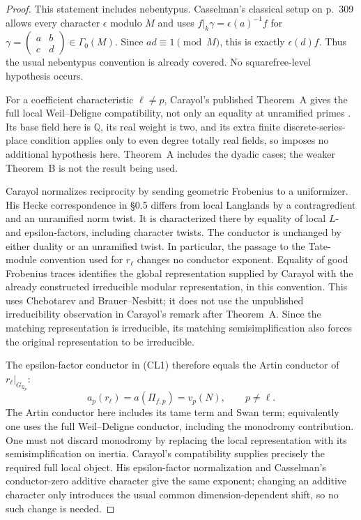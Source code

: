 \begin{proof}
This statement includes nebentypus. Casselman's classical setup on
p.~309 allows every character $\epsilon$ modulo $M$ and uses
$f|_k\gamma=\epsilon(a)^{-1}f$ for
$\gamma=\left(\begin{smallmatrix}a&b\\c&d\end{smallmatrix}\right)
\in\Gamma_0(M)$. Since $ad\equiv1\pmod M$, this is exactly
$\epsilon(d)f$. Thus the usual nebentypus convention is already
covered. No squarefree-level hypothesis occurs.

For a coefficient characteristic $\ell\ne p$, Carayol's published
Theorem~A gives the full local Weil--Deligne compatibility, not only
an equality at unramified primes
\cite[\S\S0.3--0.7, pp.~409--411]{carayol}.
Its base field here is $\mathbb Q$, its real weight is two, and its
extra finite discrete-series-place condition applies only to even
degree totally real fields, so imposes no additional hypothesis
here. Theorem~A includes the dyadic cases; the weaker Theorem~B
is not the result being used.

Carayol normalizes reciprocity by sending geometric Frobenius to
a uniformizer. His Hecke correspondence in \S0.5 differs from
local Langlands by a contragredient and an unramified norm twist.
It is characterized there by equality of local $L$- and
epsilon-factors, including character twists. The conductor is
unchanged by either duality or an unramified twist. In particular,
the passage to the Tate-module convention used for $r_\ell$ changes
no conductor exponent. Equality of good Frobenius traces identifies
the global representation supplied by Carayol with the already
constructed irreducible modular representation, in this convention.
This uses Chebotarev and Brauer--Nesbitt; it does not use the
unpublished irreducibility observation in Carayol's remark after
Theorem~A. Since the matching representation is irreducible, its
matching semisimplification also forces the original representation
to be irreducible.

The epsilon-factor conductor in (CL1) therefore equals the Artin
conductor of $r_\ell|_{G_{\mathbb Q_p}}$:
\[
 a_p(r_\ell)=a(\Pi_{f,p})=v_p(N),\qquad p\ne\ell.
\tag{CL2}
\]
The Artin conductor here includes its tame term and Swan term;
equivalently one uses the full Weil--Deligne conductor, including
the monodromy contribution. One must not discard monodromy by
replacing the local representation with its semisimplification on
inertia. Carayol's compatibility supplies precisely the required
full local object. His epsilon-factor normalization and
Casselman's conductor-zero additive character give the same
exponent; changing an additive character only introduces the usual
common dimension-dependent shift, so no such change is needed.


\end{proof}
